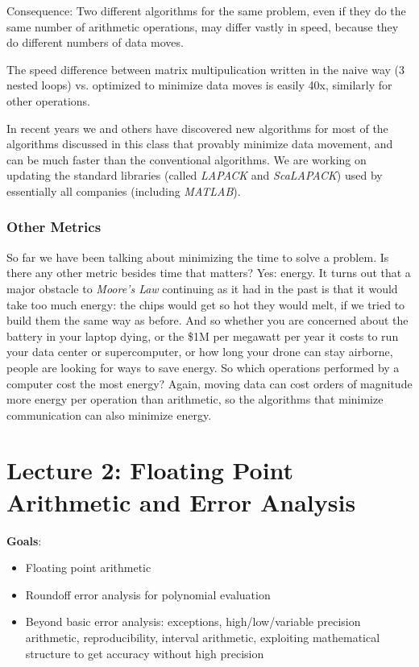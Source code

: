 \documentclass[11pt]{article}
\numberwithin{equation}{section}
\begin{document}
\begin{itemize}
    Consequence: Two different algorithms for the same problem, even if they do the same number of arithmetic operations,
    may differ vastly in speed, because they do different numbers of data moves.

    \begin{example}
        The speed difference between matrix multipulication written in the naive way (3 nested loops) vs. optimized to minimize data moves is easily 40x, 
        similarly for other operations.
    \end{example}
    
    In recent years we and others have discovered new algorithms for most of the algorithms discussed in this class that provably minimize data movement, 
    and can be much faster than the conventional algorithms. We are working on updating the standard libraries (called \textit{LAPACK} and \textit{ScaLAPACK})
    used by essentially all companies (including \textit{MATLAB}).
\end{itemize}

\subsubsection{Other Metrics}
So far we have been talking about minimizing the time to solve a problem. Is there any other metric besides time that matters?
Yes: energy. It turns out that a major obstacle to \textit{Moore's Law} continuing as it had in the past is that it would take too much energy: 
the chips would get so hot they would melt, if we tried to build them the same way as before. 
And so whether you are concerned about the battery in your laptop dying, or the \$1M per megawatt per year it costs to run your data center or supercomputer,
or how long your drone can stay airborne, people are looking for ways to save energy. So which operations performed by a computer cost the most energy? 
Again, moving data can cost orders of magnitude more energy per operation than arithmetic, so the algorithms that minimize communication can also minimize energy.

\newpage
\section{Lecture 2: Floating Point Arithmetic and Error Analysis}
\textbf{Goals}: \begin{itemize}
    \item Floating point arithmetic
    \item Roundoff error analysis for polynomial evaluation
    \item Beyond basic error analysis: exceptions, high/low/variable precision arithmetic, reproducibility, interval arithmetic, exploiting mathematical structure to get accuracy without high precision
\end{itemize}
\end{document}
